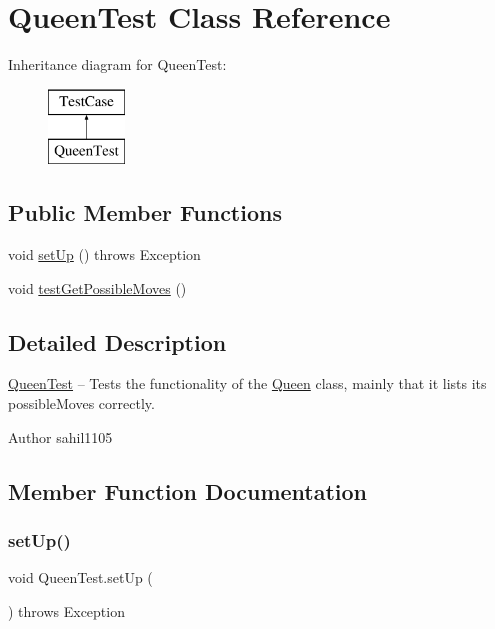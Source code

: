 \hypertarget{class_queen_test}{}\section{Queen\+Test Class Reference}
\label{class_queen_test}
Inheritance diagram for Queen\+Test\+:\begin{figure}[H]
\begin{center}
\leavevmode
\includegraphics[height=2.000000cm]{class_queen_test}
\end{center}
\end{figure}
\subsection*{Public Member Functions}
\begin{DoxyCompactItemize}
\item 
void \mbox{\hyperlink{class_queen_test_a67c6d63ced15c7930f93bb57059cedac}{set\+Up}} ()  throws Exception 
\item 
void \mbox{\hyperlink{class_queen_test_a8442b3f0820f52a727610b475de84514}{test\+Get\+Possible\+Moves}} ()
\end{DoxyCompactItemize}


\subsection{Detailed Description}
\mbox{\hyperlink{class_queen_test}{Queen\+Test}} -- Tests the functionality of the \mbox{\hyperlink{class_queen}{Queen}} class, mainly that it lists its possible\+Moves correctly. \begin{DoxyAuthor}{Author}
sahil1105 
\end{DoxyAuthor}


\subsection{Member Function Documentation}
\mbox{\label{class_queen_test_a67c6d63ced15c7930f93bb57059cedac}} 
\subsubsection{\texorpdfstring{set\+Up()}{setUp()}}
{\footnotesize\ttfamily void Queen\+Test.\+set\+Up (\begin{DoxyParamCaption}{ }\end{DoxyParamCaption}) throws Exception}

